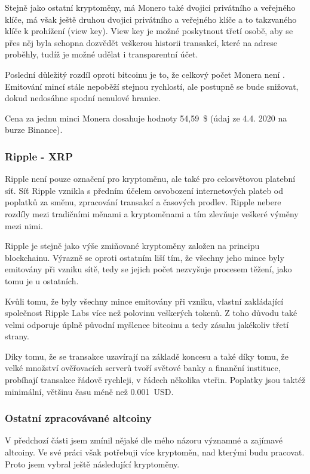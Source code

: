 \documentclass[thesis=B,czech]{FITthesis}[2019/03/21]
\begin{document}
Stejně jako ostatní kryptoměny, má Monero také dvojici privátního a veřejného klíče, má však ještě druhou dvojici privátního a veřejného klíče a to takzvaného klíče k prohížení (view key). View key je možné poskytnout třetí osobě, aby se přes něj byla schopna dozvědět veškerou historii transakcí, které na adrese proběhly, tudíž je možné udělat i transparentní účet.

Poslední důležitý rozdíl oproti bitcoinu je to, že celkový počet Monera není . Emitování mincí stále nepoběží stejnou rychlostí, ale postupně se bude snižovat, dokud nedosáhne spodní nenulové hranice. \cite{alza_monero}

Cena za jednu minci Monera dosahuje hodnoty 54,59~\$ (údaj ze 4.4. 2020 na burze Binance). \cite{binance_markets}

\subsubsection{Ripple - XRP}
Ripple není pouze označení pro kryptoměnu, ale také pro celosvětovou platební síť. Síť Ripple vznikla s předním účelem osvobození internetových plateb od poplatků za směnu, zpracování transakcí a časových prodlev. Ripple nebere rozdíly mezi tradičními měnami a kryptoměnami a tím zlevňuje veškeré výměny mezi nimi.

Ripple je stejně jako výše zmiňované kryptoměny založen na principu blockchainu. Výrazně se oproti ostatním liší tím, že všechny jeho mince byly emitovány při vzniku sítě, tedy se jejich počet nezvyšuje procesem těžení, jako tomu je u ostatních.

Kvůli tomu, že byly všechny mince emitovány při vzniku, vlastní zakládající společnost Ripple Labs více než polovinu veškerých tokenů. Z toho důvodu také velmi odporuje úplně původní myšlence bitcoinu a tedy zásahu jakékoliv třetí strany. \cite{alza_ripple}

Díky tomu, že se transakce uzavírají na základě koncesu a také díky tomu, že velké množství ověřovacích serverů tvoří světové banky a finanční instituce, probíhají transakce řádově rychleji, v řádech několika vteřin. Poplatky jsou taktéž minimální, většinu času méně než 0.001~USD. \cite{bitinfocharts} \cite{coincodex_ripple}

\subsubsection{Ostatní zpracovávané altcoiny}
V předchozí části jsem zmínil nějaké dle mého názoru významné a zajímavé altcoiny. Ve své práci však potřebuji více kryptoměn, nad kterými budu pracovat. Proto jsem vybral ještě následující kryptoměny.
\end{document}
